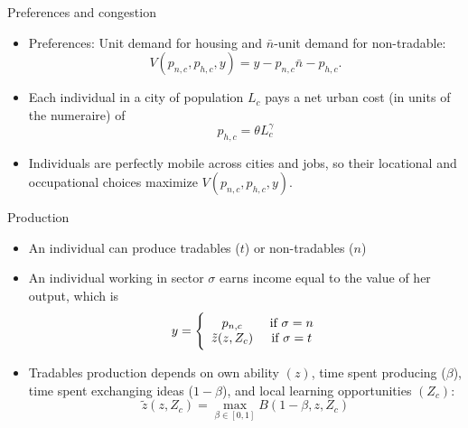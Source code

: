 \documentclass[10pt,notes=hide]{beamer}
\begin{document}
\begin{frame}{Preferences and congestion}
\begin{itemize}
	\item Preferences: Unit demand for housing and $\bar{n}$-unit demand for non-tradable:
	\begin{equation*}
	V(p_{n,c},p_{h,c},y)= y-p_{n,c}\bar{n}-p_{h,c}. \label{indirect_utility}
	\end{equation*}
	\item Each individual in a city of population $L_c$ pays a net urban cost (in units of the numeraire) of 
	\begin{equation*}
	p_{h,c} = \theta L_c^\gamma
	\end{equation*}
	\item Individuals are perfectly mobile across cities and jobs, so their locational and occupational choices maximize $V(p_{n,c},p_{h,c},y)$.
\end{itemize}
\end{frame}
\begin{frame}{Production}
\begin{itemize}
	\item An individual can produce tradables ($t$) or non-tradables ($n$)
	\item An individual working in sector $\sigma$ earns income equal to the value of her output, which is
		\begin{equation*}
		y =  \Bigg\{\begin{array}{cc}
		p_{n,c} & \textnormal{ if } \sigma = n \\
		\tilde{z}(z,{Z}_{c})  & \textnormal{ if } \sigma = t \end{array}
		\end{equation*}
	\item Tradables production depends on own ability $(z)$, time spent producing ($\beta$), time spent exchanging ideas ($1-\beta$), and local learning opportunities $(Z_{c})$:
		\begin{equation*}
		\tilde{z}(z,Z_c) = \max_{\beta\in[0,1]} B(1-\beta,z,Z_c)
		\end{equation*}
\end{itemize}
\end{frame}
\end{document}
